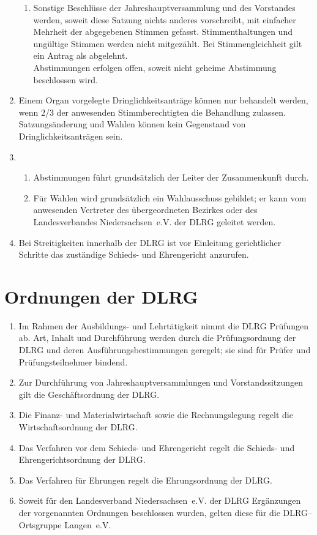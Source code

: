 \documentclass[%
12pt, %
a4paper, %
headsepline, %
footsepline, %
parskip, %
headings=normal, %
]{scrartcl}
\begin{document}
\begin{enumerate}
\begin{enumerate}[noitemsep]
        \item Sonstige Beschlüsse der Jahreshauptversammlung und des Vorstandes werden, soweit diese Satzung nichts anderes vorschreibt, mit einfacher Mehrheit der abgegebenen Stimmen gefasst. Stimmenthaltungen und ungültige Stimmen werden nicht mitgezählt. Bei Stimmengleichheit gilt ein Antrag als abgelehnt.\\
          Abstimmungen erfolgen offen, soweit nicht geheime Abstimmung beschlossen wird.
      \end{enumerate}
    \item Einem Organ vorgelegte Dringlichkeitsanträge können nur behandelt werden, wenn \num{2/3} der anwesenden Stimmberechtigten die Behandlung zulassen. Satzungsänderung und Wahlen können kein Gegenstand von Dringlichkeitsanträgen sein.
    \item \begin{enumerate}[noitemsep]
        \item Abstimmungen führt grundsätzlich der Leiter der Zusammenkunft durch.
        \item Für Wahlen wird grundsätzlich ein Wahlausschuss gebildet; er kann vom anwesenden Vertreter des übergeordneten Bezirkes oder des Landesverbandes Niedersachsen~e.V. der DLRG geleitet werden.
      \end{enumerate}
    \item Bei Streitigkeiten innerhalb der DLRG ist vor Einleitung gerichtlicher Schritte das zuständige Schieds- und Ehrengericht anzurufen.
\end{enumerate}

\section{Ordnungen der DLRG}
\label{sec:ordnungen}
\begin{enumerate}
    \item Im Rahmen der Ausbildungs- und Lehrtätigkeit nimmt die DLRG Prüfungen ab. Art, Inhalt und Durchführung werden durch die Prüfungsordnung der DLRG und deren Ausführungsbestimmungen geregelt; sie sind für Prüfer und Prüfungsteilnehmer bindend.
    \item Zur Durchführung von Jahreshauptversammlungen und Vorstandssitzungen gilt die Geschäftsordnung der DLRG.
    \item Die Finanz- und Materialwirtschaft sowie die Rechnungslegung regelt die Wirtschaftsordnung der DLRG.
    \item Das Verfahren vor dem Schieds- und Ehrengericht regelt die Schieds- und Ehrengerichtsordnung der DLRG.
    \item Das Verfahren für Ehrungen regelt die Ehrungsordnung der DLRG.
    \item Soweit für den Landesverband Niedersachsen~e.V. der DLRG Ergänzungen der vorgenannten Ordnungen beschlossen wurden, gelten diese für die DLRG--Ortsgruppe Langen~e.V.
\end{enumerate}
\end{document}
